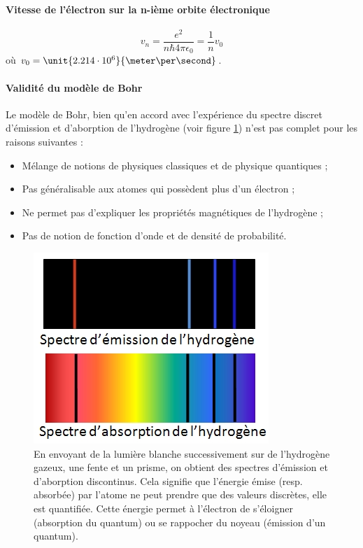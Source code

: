 \paragraph{Vitesse de l'électron sur la n-ième orbite électronique}
\[v_n = \frac{e^2}{n\hbar 4\pi\epsilon_0} = \frac{1}{n}v_0\]
où $v_0 = \unit{2.214\cdot10^6}{\meter\per\second}$.
\paragraph{Validité du modèle de Bohr}
Le modèle de Bohr, bien qu'en accord avec l'expérience
du spectre discret d'émission et d'aborption de l'hydrogène (voir
figure \ref{fig:spectres-h}) n'est pas complet pour les raisons
suivantes :
\begin{itemize}
	\item Mélange de notions de physiques classiques et
	de physique quantiques ;
	\item Pas généralisable aux atomes qui possèdent
	plus d'un électron ;
	\item Ne permet pas d'expliquer les propriétés
	magnétiques de l'hydrogène ;
	\item Pas de notion de fonction d'onde et de densité
	de probabilité.
\end{itemize}

\begin{figure}[ht]
	\centering
	\includegraphics[scale=0.6]{img/spectres-h.jpg}
	\caption{En envoyant de la lumière blanche successivement
	sur de l'hydrogène gazeux, une fente et un prisme, on obtient
	des spectres d'émission et d'aborption discontinus. Cela signifie
	que l'énergie émise (resp. absorbée) par l'atome ne peut prendre
	que des valeurs discrètes, elle est quantifiée. Cette énergie
	permet à l'électron de s'éloigner (absorption du quantum)
	ou se rappocher du noyeau (émission d'un quantum).}
	\label{fig:spectres-h}
\end{figure}

